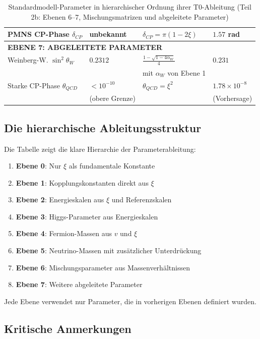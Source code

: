 \begin{table}[htbp]
{\begin{tabular}{p{4cm}p{2.5cm}p{3.5cm}p{2.7cm}}
			PMNS CP-Phase $\delta_{CP}$ & unbekannt & $\delta_{CP} = \pi(1 - 2\xi)$ & $1.57$ rad \\
			\midrule
			\multicolumn{4}{l}{\textbf{EBENE 7: ABGELEITETE PARAMETER}} \\
			\midrule
			Weinberg-W. $\sin^2\theta_W$ & $0.2312$ & $\tfrac{1{-}\sqrt{1{-}4\alpha_W}}{4}$ & $0.231$ \\
			& & mit $\alpha_W$ von Ebene 1 & \\[0.3em]
			Starke CP-Phase $\theta_{QCD}$ & $< 10^{-10}$ & $\theta_{QCD} = \xi^{2}$ & $1.78 \times 10^{-8}$ \\
			& (obere Grenze) & & (Vorhersage) \\
			\bottomrule
		\end{tabular}%
}
	\caption{Standardmodell-Parameter in hierarchischer Ordnung ihrer T0-Ableitung (Teil 2b: Ebenen 6--7, Mischungsmatrizen und abgeleitete Parameter)}
	\label{tab:sm-params-2b}
\end{table}

\subsection{Die hierarchische Ableitungsstruktur}
\label{subsec:hierarchical_structure}

Die Tabelle zeigt die klare Hierarchie der Parameterableitung:

\begin{enumerate}
	\item \textbf{Ebene 0}: Nur $\xi$ als fundamentale Konstante
	\item \textbf{Ebene 1}: Kopplungskonstanten direkt aus $\xi$
	\item \textbf{Ebene 2}: Energieskalen aus $\xi$ und Referenzskalen
	\item \textbf{Ebene 3}: Higgs-Parameter aus Energieskalen
	\item \textbf{Ebene 4}: Fermion-Massen aus $v$ und $\xi$
	\item \textbf{Ebene 5}: Neutrino-Massen mit zusätzlicher Unterdrückung
	\item \textbf{Ebene 6}: Mischungsparameter aus Massenverhältnissen
	\item \textbf{Ebene 7}: Weitere abgeleitete Parameter
\end{enumerate}

Jede Ebene verwendet nur Parameter, die in vorherigen Ebenen definiert wurden.

\subsection{Kritische Anmerkungen}
\label{subsec:critical_notes}

